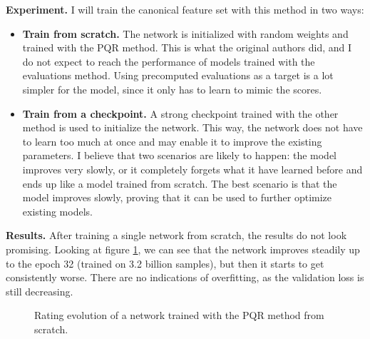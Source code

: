 \textbf{Experiment.} I will train the canonical  feature set with this method in two ways:

\begin{itemize}
\item \textbf{Train from scratch.} The network is initialized with random weights and trained with the PQR method. This is what the original authors did, and I do not expect to reach the performance of models trained with the evaluations method. Using precomputed evaluations as a target is a lot simpler for the model, since it only has to learn to mimic the scores.

\item \textbf{Train from a checkpoint.} A strong checkpoint trained with the other method is used to initialize the network. This way, the network does not have to learn too much at once and may enable it to improve the existing parameters. I believe that two scenarios are likely to happen: the model improves very slowly, or it completely forgets what it have learned before and ends up like a model trained from scratch. The best scenario is that the model improves slowly, proving that it can be used to further optimize existing models.
\end{itemize}

\textbf{Results.} After training a single network from scratch, the results do not look promising. Looking at figure \ref{pqr1-evolution}, we can see that the network improves steadily up to the epoch 32 (trained on 3.2 billion samples), but then it starts to get consistently worse. There are no indications of overfitting, as the validation loss is still decreasing.

\begin{figure}[H]
\centering
{}
\caption{Rating evolution of a network trained with the PQR method from scratch.}
\label{pqr1-evolution}
\end{figure}

